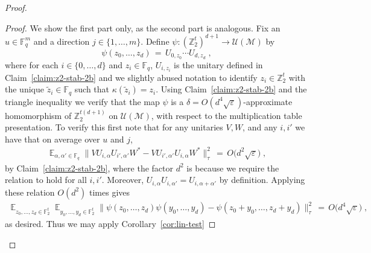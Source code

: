 \documentclass[11pt]{article}
\theoremstyle{definition}
\newcommand{\Id}{\ensuremath{I}}
\DeclareMathOperator*{\Expectation}{\mathbb{E}}
\newcommand{\Es}[1]{\Expectation_{#1}}
\newcommand{\F}{\ensuremath{\mathbb{F}}}
\newcommand{\Z}{\ensuremath{\mathbb{Z}}}
\newcommand{\mM}{\ensuremath{\mathcal{M}}}
\newcommand{\mU}{\ensuremath{\mathcal{U}}}
\DeclareMathOperator{\poly}{poly}
\newcommand{\eps}{\varepsilon}
\newcommand{\mN}{\mathcal{N}}
\begin{document}
\begin{proof}
\begin{proof}
We show the first part only, as the second part is analogous. Fix an $u\in \F_q^m$ and a direction $j\in \{1,\ldots,m\}$. Define
$\psi: (\Z_2^{t})^{d+1} \to \mU(\mM)$ by 
\[\psi(z_0,\ldots,z_{d}) \,=\, U_{0,z_0} \cdots U_{d,z_{d}}\;,\]
where for each $i\in\{0,\ldots,d\}$ and $z_i\in \F_q$, $U_{i,z_i}$ is the unitary defined in Claim~\ref{claim:z2-stab-2b} and we slightly abused notation to identify $z_i\in \Z_2^t$ with the unique $\tilde{z}_i\in \F_q$ such that $\kappa(\tilde{z}_i)=z_i$. Using Claim~\ref{claim:z2-stab-2b} and the triangle inequality we verify that the map $\psi$ is a $\delta=O(d^4\sqrt{\eps})$-approximate homomorphism of $\Z_2^{t(d+1)}$ on $\mU(\mM)$, with respect to the multiplication table presentation. To verify this first note that for any unitaries $V,W$, and any $i,i'$ we have that on average over $u$ and $j$,
\begin{align*}
\Es{\alpha,\alpha'\in \F_q} \big\| V U_{i,\alpha} U_{i',\alpha'} W^* - V U_{i',\alpha'} U_{i,\alpha}  W^*\big\|_\tau^2 \,=\, O\big(d^2 \sqrt{\eps}\big)\;,
\end{align*}
by Claim~\ref{claim:z2-stab-2b}, where the factor $d^2$ is because we require the relation to hold for all $i,i'$. Moreover, $U_{i,\alpha}U_{i,\alpha'}=U_{i,\alpha+\alpha'}$ by definition. Applying these relation $O(d^2)$ times gives
\begin{align*}
 \Es{z_0,\ldots,z_d\in\F_2^t}\Es{y_0,\ldots,y_d\in\F_2^t}\big\|\psi(z_0,\ldots,z_d)\psi(y_0,\ldots,y_d) -\psi(z_0+y_0,\ldots,z_d+y_d)\big\|_\tau^2 \,=\, O\big(d^4 \sqrt{\eps}\big)\;,
\end{align*}
as desired. Thus we may apply Corollary~\ref{cor:lin-test}

\end{proof}
\end{proof}
\end{document}
